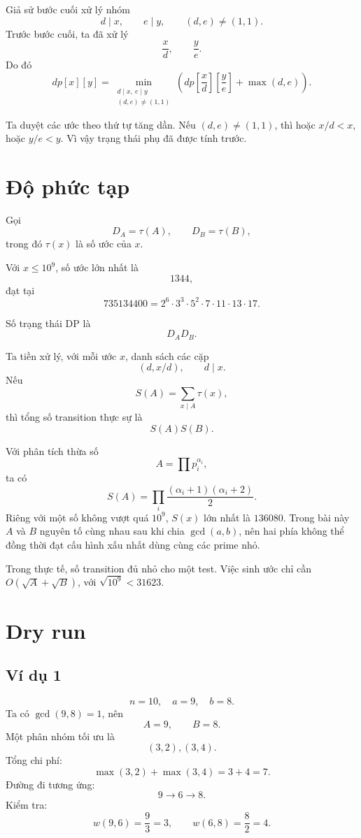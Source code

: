 \documentclass[11pt,a4paper]{article}
\begin{document}
Giả sử bước cuối xử lý nhóm
\[
  d\mid x,\qquad e\mid y,\qquad (d,e)\ne(1,1).
\]
Trước bước cuối, ta đã xử lý
\[
  \frac{x}{d},\qquad \frac{y}{e}.
\]
Do đó
\[
  dp[x][y]=
  \min_{\substack{d\mid x,\ e\mid y\\(d,e)\ne(1,1)}}
  \left(
    dp\left[\frac{x}{d}\right]\left[\frac{y}{e}\right]
    +\max(d,e)
  \right).
\]

Ta duyệt các ước theo thứ tự tăng dần. Nếu \((d,e)\ne(1,1)\), thì hoặc \(x/d<x\), hoặc \(y/e<y\). Vì vậy trạng thái phụ đã được tính trước.

\section{Độ phức tạp}

Gọi
\[
  D_A=\tau(A),\qquad D_B=\tau(B),
\]
trong đó \(\tau(x)\) là số ước của \(x\).

Với \(x\le 10^9\), số ước lớn nhất là
\[
  1344,
\]
đạt tại
\[
  735134400=2^6\cdot 3^3\cdot 5^2\cdot 7\cdot 11\cdot 13\cdot 17.
\]

Số trạng thái DP là
\[
  D_A D_B.
\]

Ta tiền xử lý, với mỗi ước \(x\), danh sách các cặp
\[
  (d,x/d),\qquad d\mid x.
\]
Nếu
\[
  S(A)=\sum_{x\mid A}\tau(x),
\]
thì tổng số transition thực sự là
\[
  S(A)S(B).
\]

Với phân tích thừa số
\[
  A=\prod p_i^{\alpha_i},
\]
ta có
\[
  S(A)=\prod_i \frac{(\alpha_i+1)(\alpha_i+2)}{2}.
\]
Riêng với một số không vượt quá \(10^9\), \(S(x)\) lớn nhất là \(136080\). Trong bài này \(A\) và \(B\) nguyên tố cùng nhau sau khi chia \(\gcd(a,b)\), nên hai phía không thể đồng thời đạt cấu hình xấu nhất dùng cùng các prime nhỏ.

Trong thực tế, số transition đủ nhỏ cho một test. Việc sinh ước chỉ cần \(O(\sqrt A+\sqrt B)\), với \(\sqrt{10^9}<31623\).

\section{Dry run}

\subsection{Ví dụ 1}

\[
n=10,\quad a=9,\quad b=8.
\]
Ta có \(\gcd(9,8)=1\), nên
\[
A=9,\qquad B=8.
\]
Một phân nhóm tối ưu là
\[
(3,2),(3,4).
\]
Tổng chi phí:
\[
\max(3,2)+\max(3,4)=3+4=7.
\]
Đường đi tương ứng:
\[
9\rightarrow 6\rightarrow 8.
\]
Kiểm tra:
\[
w(9,6)=\frac{9}{3}=3,\qquad
w(6,8)=\frac{8}{2}=4.
\]
\end{document}
